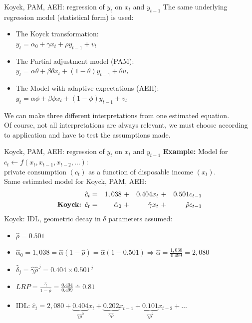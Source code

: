 \documentclass{beamer}
\begin{document}
\begin{frame}{Koyck, PAM, AEH: regression of $y_t$ on $x_t$ and $y_{t-1}$}
The same underlying regression model (statistical form) is used:
\begin{itemize}
\item The Koyck transformation:\\
$y_t = \alpha_0 + \gamma x_t + \rho y_{t-1} + v_t$\\
\smallskip
\item The Partial adjustment model (PAM):\\
$y_t = \alpha \theta + \beta \theta x_t + (1-\theta) y_{t-1} + \theta u_t$\\
\smallskip
\item The Model with adaptive expectations (AEH):\\
$y_t = \alpha \phi + \beta \phi x_{t} + (1-\phi) y_{t-1} + v_t $\\

\end{itemize}
\vspace{0.3cm}
We can make three different interpretations from one estimated equation.\\
\vspace{0.3cm}
Of course, not all interpretations are always relevant, we must choose according to application and have to test the assumptions made.
\end{frame}
\begin{frame}{Koyck, PAM, AEH: regression of $y_t$ on $x_t$ and $y_{t-1}$}
\textbf{Example:} Model for $c_t \leftarrow f(x_t,x_{t-1},x_{t-2},\dots)$:\\
private consumption $(c_t)$ as a function of disposable income $(x_t)$.\\
Same estimated model for Koyck, PAM, AEH:
\begin{equation*}
\begin{aligned}
\hat{c}_t & = &1,038~&+ &0.404 x_t~ &+ &0.501 c_{t-1} \\
\textnormal{\textbf{Koyck:}} \,\,\, \hat{c}_t & = &\hat{\alpha}_0~&+ &\hat{\gamma} x_t~ &+ &\hat{\rho} c_{t-1} 
\end{aligned}
\end{equation*}
Koyck: IDL, geometric decay in $\delta$ parameters assumed:
\begin{itemize}
\item $\hat{\rho}=0.501$
\smallskip
\item $\hat{\alpha}_0 = 1,038 = \hat{\alpha}(1-\hat{\rho}) = \hat{\alpha}(1-0.501) 
\Rightarrow \hat{\alpha}= \frac{1,038}{0.499}=2,080$
\item $\hat{\delta}_j = \hat{\gamma} \hat{\rho}^{\,j}=0.404 \times 0.501^{\,j}$
\smallskip
\item $\textit{LRP}=\frac{\hat{\gamma}}{1-\hat{\rho}}= \frac{0.404}{0.499} \doteq 0.81 $
\smallskip
\item IDL: $\hat{c}_t = 2,080 + \underbrace{0.404}_{\hat{\gamma} \hat{\rho}^{0}} x_t + \underbrace{0.202}_{\hat{\gamma} \hat{\rho}} x_{t-1} 
+ \underbrace{0.101}_{\hat{\gamma} \hat{\rho}^{2}} x_{t-2} + \dots$
\end{itemize}
\end{frame}
\end{document}
